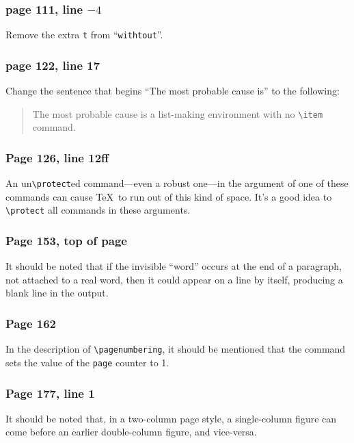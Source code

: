\subsubsection*{page 111, line $-4$}
Remove the extra {\tt t} from ``{\tt withtout}''.

\subsubsection*{page 122, line 17}
Change the sentence that begins ``The most probable cause is'' to
the following:
\begin{quote}
The most probable cause is a list-making environment with no
\verb|\item| command.
\end{quote}


\subsubsection*{Page 126, line 12ff}
An un\verb|\protect|ed command---even a robust one---in the argument
of one of these commands can cause \TeX\ to run out of this kind of
space.  It's a good idea to \verb|\protect| all commands in
these arguments.


\subsubsection*{Page 153, top of page}
It should be noted that if the invisible ``word'' occurs at the end
of a paragraph, not attached to a real word, then it could appear
on a line by itself, producing a blank line in the output.

\subsubsection*{Page 162}

In the description of \verb|\pagenumbering|, it should be mentioned
that the command sets the value of the {\tt page} counter to 1.

\subsubsection*{Page 177, line 1}
It should be noted that, in a two-column page style, a single-column
figure can come before an earlier double-column figure, and vice-versa.

